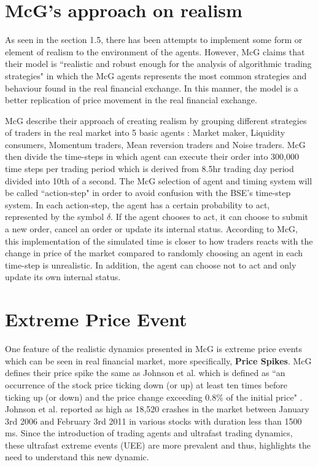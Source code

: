 \section{McG's approach on realism}
As seen in the section 1.5, there has been attempts to implement some form or element of realism to the environment of the agents. However, McG claims that their model is ``realistic and robust enough for the analysis of algorithmic trading strategies"\cite{McGroarty} in which the McG agents represents the most common strategies and behaviour found in the real financial exchange. In this manner, the model is a better replication of price movement in the real financial exchange. 

McG describe their approach of creating realism by grouping different strategies of traders in the real market into 5 basic agents : Market maker, Liquidity consumers, Momentum traders, Mean reversion traders and Noise traders. McG then divide the time-steps in which agent can execute their order into 300,000 time steps per trading period which is derived from 8.5hr trading day period divided into 10th of a second. The McG selection of agent and timing system will be called ``action-step" in order to avoid confusion with the BSE's time-step system. In each action-step, the agent has a certain probability to act, represented by the symbol $\delta$. If the agent chooses to act, it can choose to submit a new order, cancel an order or update its internal status. According to McG, this implementation of the simulated time is closer to how traders reacts with the change in price of the market compared to randomly choosing an agent in each time-step is unrealistic. In addition, the agent can choose not to act and only update its own internal status.

\section{Extreme Price Event}
One feature of the realistic dynamics presented in McG is extreme price events which can be seen in real financial market, more specifically, \textbf{Price Spikes}. McG defines their price spike the same as Johnson et al. which is  defined as ``an occurrence of the stock price ticking down (or up) at least ten times before ticking up (or down) and the price change exceeding 0.8\% of the initial price" \cite{Johnson}. Johnson et al. reported as high as 18,520 crashes in the market between January 3rd 2006 and February 3rd 2011 in various stocks with duration less than 1500 ms. Since the introduction of trading agents and ultrafast trading dynamics, these ultrafast extreme events (UEE) are more prevalent and thus, highlights the need to understand this new dynamic. 

